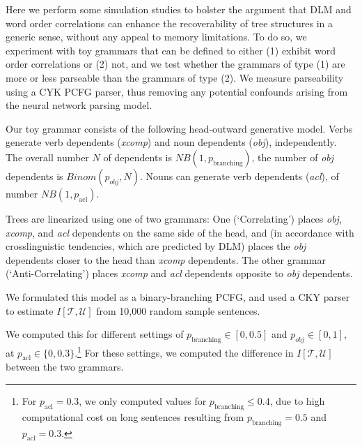 \documentclass[10pt,twoside,lineno]{article}
\begin{document}
Here we perform some simulation studies to bolster the argument that DLM and word order correlations can enhance the recoverability of tree structures in a generic sense, without any appeal to memory limitations. To do so, we experiment with toy grammars that can be defined to either (1) exhibit word order correlations or (2) not, and we test whether the grammars of type (1) are more or less parseable than the grammars of type (2). We measure parseability using a CYK PCFG parser, thus removing any potential confounds arising from the neural network parsing model.

Our toy grammar consists of the following head-outward generative model.
Verbs generate verb dependents (\emph{xcomp}) and noun dependents (\emph{obj}), independently.
The overall number $N$ of dependents is $NB(1, p_\text{branching})$, the number of \emph{obj} dependents is $Binom(p_{obj}, N)$.
Nouns can generate verb dependents (\emph{acl}), of number $NB(1, p_\text{acl})$.

Trees are linearized using one of two grammars: One (`Correlating') places \emph{obj}, \emph{xcomp}, and \emph{acl} dependents on the same side of the head, and (in accordance with crosslinguistic tendencies, which are predicted by DLM) places the \emph{obj} dependents closer to the head than \emph{xcomp} dependents.
The other grammar (`Anti-Correlating') places \emph{xcomp} and \emph{acl} dependents opposite to \emph{obj} dependents.

We formulated this model as a binary-branching PCFG, and used a CKY parser to estimate $I[\mathcal{T}, \mathcal{U}]$ from 10,000 random sample sentences.

We computed this for different settings of $p_\text{branching} \in [0, 0.5]$ and $p_{obj} \in [0,1]$, at $p_\text{acl} \in \{0, 0.3\}$.\footnote{For $p_\text{acl} = 0.3$, we only computed values for $p_\text{branching} \leq 0.4$, due to high computational cost on long sentences resulting from $p_\text{branching} = 0.5$ and $p_\text{acl} = 0.3$.}
For these settings, we computed the difference in $I[\mathcal{T}, \mathcal{U}]$ between the two grammars.
\end{document}
